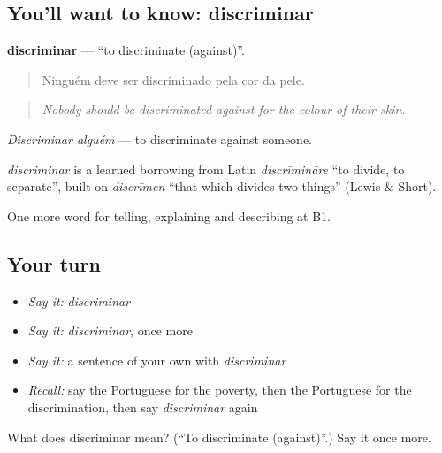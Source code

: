 \subsection*{You'll want to know: discriminar}
\textbf{discriminar} — \textquotedblleft{}to discriminate (against)\textquotedblright{}.

\begin{quote}
Ninguém deve ser discriminado pela cor da pele.
\end{quote}

\begin{quote}
\emph{Nobody should be discriminated against for the colour of their skin.}
\end{quote}

\emph{Discriminar alguém} — to discriminate against someone.

\begin{cousinweb}
\emph{discriminar} is a learned borrowing from Latin \emph{discrīmināre} \textquotedblleft{}to divide, to separate\textquotedblright{}, built on \emph{discrīmen} \textquotedblleft{}that which divides two things\textquotedblright{} (Lewis \& Short).
\end{cousinweb}

\begin{grammarlens}[title={What you've built}]
One more word for telling, explaining and describing at B1.
\end{grammarlens}

\subsection*{Your turn}
\begin{itemize}
\raggedright
  \item \emph{Say it:} \emph{discriminar}
  \item \emph{Say it:} \emph{discriminar}, once more
  \item \emph{Say it:} a sentence of your own with \emph{discriminar}
  \item \emph{Recall:} say the Portuguese for the poverty, then the Portuguese for the discrimination, then say \emph{discriminar} again
\end{itemize}

\begin{tcolorbox}[breakable,colback=teal!4,colframe=teal!35!black,title={Before you move on}]
What does discriminar mean? (\textquotedblleft{}To discriminate (against)\textquotedblright{}.) Say it once more.
\end{tcolorbox}
